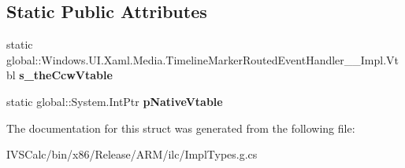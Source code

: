 \subsection*{Static Public Attributes}
\begin{DoxyCompactItemize}
\item 
\mbox{\label{struct_windows_1_1_u_i_1_1_xaml_1_1_media_1_1_timeline_marker_routed_event_handler_____impl_1_1_vtbl_a3fc21e6e280e272b9f1fdd3984052a28}} 
static global\+::\+Windows.\+U\+I.\+Xaml.\+Media.\+Timeline\+Marker\+Routed\+Event\+Handler\+\_\+\+\_\+\+Impl.\+Vtbl {\bfseries s\+\_\+the\+Ccw\+Vtable}
\item 
\mbox{\label{struct_windows_1_1_u_i_1_1_xaml_1_1_media_1_1_timeline_marker_routed_event_handler_____impl_1_1_vtbl_a4c94864575eceafbb3ba2ff52ac1d6bd}} 
static global\+::\+System.\+Int\+Ptr {\bfseries p\+Native\+Vtable}
\end{DoxyCompactItemize}


The documentation for this struct was generated from the following file\+:\begin{DoxyCompactItemize}
\item 
I\+V\+S\+Calc/bin/x86/\+Release/\+A\+R\+M/ilc/Impl\+Types.\+g.\+cs\end{DoxyCompactItemize}
